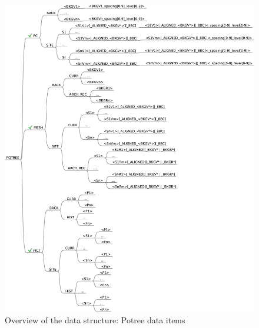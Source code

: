 \begin{figure}[] \centering
\includegraphics[width=1\textwidth]{fig/data_structure/directory_structure_potree}
\caption{Overview of the data structure: Potree data items}
\label{fig:directory_structure_overview_potree} \end{figure}

